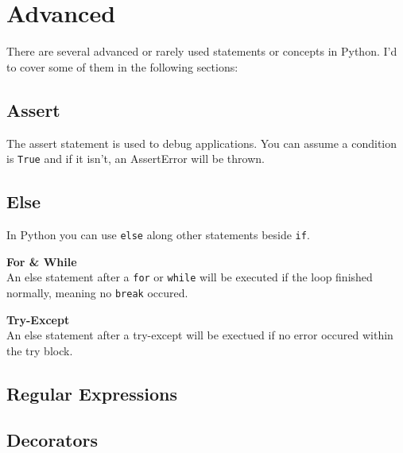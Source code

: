 \section{Advanced}
    
    There are several advanced or rarely used statements or concepts in Python.
    I'd to cover some of them in the following sections:

    \subsection{Assert}
        The assert statement is used to debug applications.
        You can assume a condition is \texttt{True} and if it isn't,
        an AssertError will be thrown.


    \subsection{Else}

        In Python you can use \texttt{else} along other statements beside
        \texttt{if}.

        \begin{indentblock}

            \textbf{For \& While} \\
            An else statement after a \texttt{for} or \texttt{while}
            will be executed if the loop finished normally, meaning no \texttt{break}
            occured.

            \textbf{Try-Except} \\
            An else statement after a try-except will be exectued if no error occured within the try block.

        \end{indentblock}

    \subsection{Regular Expressions}

    \subsection{Decorators}
